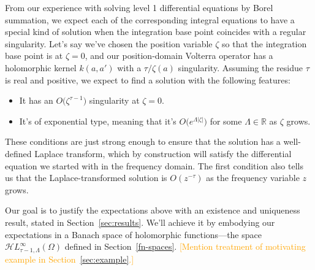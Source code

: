 \documentclass{article}
\theoremstyle{plain}
\newcommand{\R}{\mathbb{R}}
\newcommand{\singexp}[2]{\mathcal{H}L^\infty_{#1, #2}}
\newcommand{\domain}{\Omega}
\begin{document}
From our experience with solving level 1 differential equations by Borel summation, we expect each of the corresponding integral equations to have a special kind of solution when the integration base point coincides with a regular singularity. Let's say we've chosen the position variable $\zeta$ so that the integration base point is at $\zeta = 0$, and our position-domain Volterra operator has a holomorphic kernel $k(a, a')$ with a $\tau/\zeta(a)$ singularity. Assuming the residue $\tau$ is real and positive, we expect to find a solution with the following features:
\begin{itemize}
\item It has an $O\big(\zeta^{\tau-1}\big)$ singularity at $\zeta = 0$.
\item It's of exponential type, meaning that it's $O\big(e^{\Lambda|\zeta|}\big)$ for some $\Lambda \in \R$ as $\zeta$ grows.
\end{itemize}
These conditions are just strong enough to ensure that the solution has a well-defined Laplace transform, which by construction will satisfy the differential equation we started with in the frequency domain. The first condition also tells us that the Laplace-transformed solution is $O(z^{-\tau})$ as the frequency variable $z$ grows.

Our goal is to justify the expectations above with an existence and uniqueness result, stated in Section~\ref{sec:results}. We'll achieve it by embodying our expectations in a Banach space of holomorphic functions---the space $\singexp{\tau-1}{\Lambda}(\domain)$ defined in Section~\ref{fn-spaces}. \textcolor{orange}{[Mention treatment of motivating example in Section~\ref{sec:example}.]}
\end{document}

